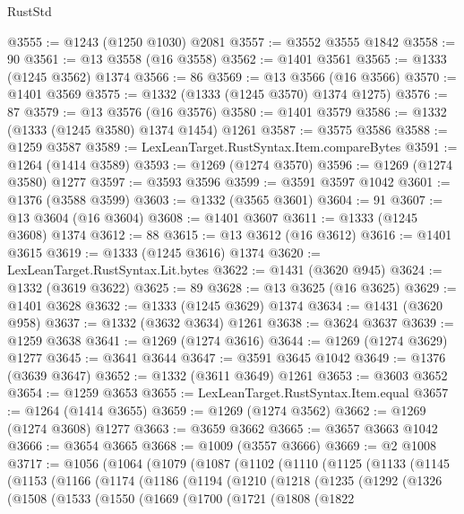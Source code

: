 \begin{lexlean}{RustStd}
\begin{coremodule}
@3555 := @1243 (@1250 @1030) @2081
@3557 := @3552 @3555 @1842
@3558 := 90
@3561 := @13 @3558 (@16 @3558)
@3562 := @1401 @3561
@3565 := @1333 (@1245 @3562) @1374
@3566 := 86
@3569 := @13 @3566 (@16 @3566)
@3570 := @1401 @3569
@3575 := @1332 (@1333 (@1245 @3570) @1374 @1275)
@3576 := 87
@3579 := @13 @3576 (@16 @3576)
@3580 := @1401 @3579
@3586 := @1332 (@1333 (@1245 @3580) @1374 @1454) @1261
@3587 := @3575 @3586
@3588 := @1259 @3587
@3589 := LexLeanTarget.RustSyntax.Item.compareBytes
@3591 := @1264 (@1414 @3589)
@3593 := @1269 (@1274 @3570)
@3596 := @1269 (@1274 @3580) @1277
@3597 := @3593 @3596
@3599 := @3591 @3597 @1042
@3601 := @1376 (@3588 @3599)
@3603 := @1332 (@3565 @3601)
@3604 := 91
@3607 := @13 @3604 (@16 @3604)
@3608 := @1401 @3607
@3611 := @1333 (@1245 @3608) @1374
@3612 := 88
@3615 := @13 @3612 (@16 @3612)
@3616 := @1401 @3615
@3619 := @1333 (@1245 @3616) @1374
@3620 := LexLeanTarget.RustSyntax.Lit.bytes
@3622 := @1431 (@3620 @945)
@3624 := @1332 (@3619 @3622)
@3625 := 89
@3628 := @13 @3625 (@16 @3625)
@3629 := @1401 @3628
@3632 := @1333 (@1245 @3629) @1374
@3634 := @1431 (@3620 @958)
@3637 := @1332 (@3632 @3634) @1261
@3638 := @3624 @3637
@3639 := @1259 @3638
@3641 := @1269 (@1274 @3616)
@3644 := @1269 (@1274 @3629) @1277
@3645 := @3641 @3644
@3647 := @3591 @3645 @1042
@3649 := @1376 (@3639 @3647)
@3652 := @1332 (@3611 @3649) @1261
@3653 := @3603 @3652
@3654 := @1259 @3653
@3655 := LexLeanTarget.RustSyntax.Item.equal
@3657 := @1264 (@1414 @3655)
@3659 := @1269 (@1274 @3562)
@3662 := @1269 (@1274 @3608) @1277
@3663 := @3659 @3662
@3665 := @3657 @3663 @1042
@3666 := @3654 @3665
@3668 := @1009 (@3557 @3666)
@3669 := @2 @1008
@3717 := @1056
    (@1064
      (@1079
        (@1087
          (@1102
            (@1110
              (@1125
                (@1133
                  (@1145
                    (@1153
                      (@1166
                        (@1174
                          (@1186
                            (@1194
                              (@1210
                                (@1218
                                  (@1235
                                    (@1292
                                      (@1326
                                        (@1508
                                          (@1533
                                            (@1550
                                              (@1669
                                                (@1700
                                                  (@1721
                                                    (@1808
                                                      (@1822

\end{coremodule}
\end{lexlean}
